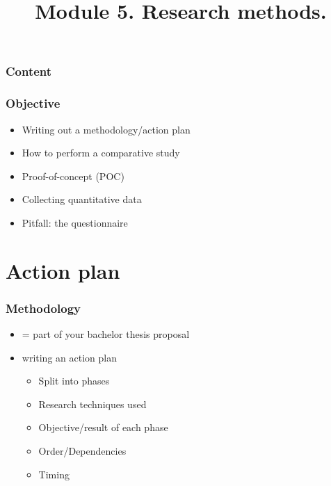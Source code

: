 \documentclass[aspectratio=169]{beamer}
\title{Module 5. Research methods.}
\subtitle{\coursename}
\author{\lecturers}   %
\date{\academicyear}
\begin{document}
\begin{frame}
  \maketitle
\end{frame}

\begin{frame}
  \frametitle{Content}

  \tableofcontents
\end{frame}

\begin{frame}
  \frametitle{Objective}

  \begin{itemize}
    \item Writing out a methodology/action plan
    \item How to perform a comparative study
    \item Proof-of-concept (POC)
    \item Collecting quantitative data
    \item Pitfall: the questionnaire
  \end{itemize}
\end{frame}

\section{Action plan}

\begin{frame}
  \frametitle{Methodology}

  \begin{itemize}
    \item = part of your bachelor thesis proposal
    \item writing an action plan
          \begin{itemize}
            \item Split into phases
            \item Research techniques used
            \item Objective/result of each phase
            \item Order/Dependencies
            \item Timing
          \end{itemize}
  \end{itemize}


\end{frame}
\end{document}
